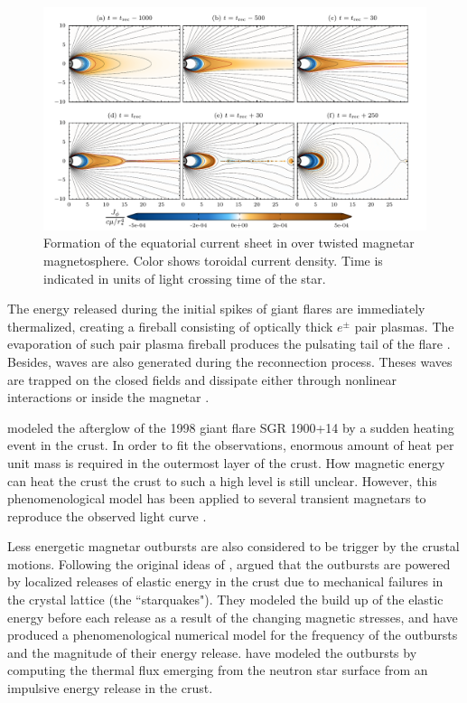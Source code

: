 \begin{figure}[h]
  \centering
  \includegraphics[width=\textwidth]{pics/intro/ffe-giant-flare.png}
  \caption[Formation of the equatorial current sheet in an over-twisted magnetar
    magnetosphere.]{Formation of the equatorial current sheet in over twisted magnetar
    magnetosphere. Color shows toroidal current density. Time is indicated in
    units of light crossing time of the star. \citep{2013ApJ...774...92P}}
  \label{fig:overtwisted-magnetar}
\end{figure}
%
The energy released during the initial spikes of giant flares are immediately thermalized, creating a fireball consisting of optically thick $e^\pm$ pair plasmas.
The evaporation of such pair plasma fireball produces the pulsating tail of the flare  \citep{1995MNRAS.275..255T,1996ApJ...473..322T}.
Besides, \alfven waves are also generated during the reconnection process.
Theses waves are trapped on the closed fields and dissipate either through nonlinear interactions \citep{1998PhRvD..57.3219T} or inside the magnetar \citep{2015ApJ...815...25L}.

\citet{2002ApJ...580L..69L} modeled the afterglow of the 1998 giant flare SGR 1900+14 by a sudden heating event in the crust.
In order to fit the observations, enormous amount of heat per unit mass is required in the outermost layer of the crust. 
How magnetic energy can heat the crust the crust to such a high level is still unclear. However, this phenomenological model has been applied to several transient magnetars to reproduce the observed light curve \citep{2013ApJ...770...65R,2014ApJ...786...62S}.

Less energetic magnetar outbursts are also considered to be trigger by the crustal motions.
Following the original ideas of \citet{1996ApJ...473..322T}, \citet{2011ApJ...727L..51P} argued that the outbursts are powered by localized releases of elastic energy in the crust  due to mechanical failures in the crystal lattice (the ``starquakes"). 
They modeled the build up of the elastic energy before each release as a result of the changing magnetic stresses, and have produced a phenomenological numerical model for the frequency of the outbursts and the magnitude of their energy release.  \citet{2012ApJ...750L...6P} have modeled the outbursts by computing the thermal flux emerging from the neutron star surface from an impulsive energy release in the crust. 


